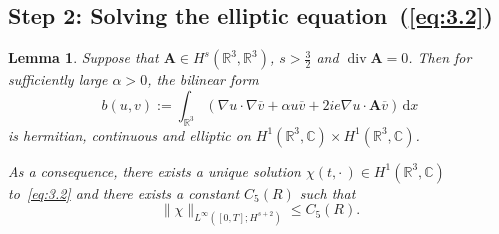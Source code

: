 \documentclass[10pt]{amsart}
\newtheorem{lemm}[theo]{Lemma}\newtheorem{prop}[theo]{Proposition}\newtheorem{coro}[theo]{Corollary}\newtheorem{conj}[theo]{Conjecture}
\theoremstyle{definition}\newtheorem{defi}[theo]{Definition}\newtheorem{rema}[theo]{Remark}\newtheorem{exam}[theo]{Example}\newtheorem{exem}[theo]{Example}\newtheorem{nota}[theo]{Notation}
\newcommand{\BA}{\mathbf{A}}
\newcommand{\R}{\mathbb{R}}
\newcommand{\Com}{\mathbb{C}}
\DeclareMathOperator{\Div}{div}
\newcommand*{\dd}{\mathrm{d}}
\newcommand*{\dx}{\dd x}
\begin{document}
\subsection*{Step 2: Solving the elliptic equation~(\ref{eq:3.2})}

\begin{lemm}\label{elliptic2}
Suppose that $\BA \in H^s(\R^3,\R^3)$, $s > \frac{3}{2}$ and $\Div \BA=0$. Then for sufficiently large $\alpha>0$, the bilinear form
\[
b(u,v) := \int_{\R^3} (\nabla u \cdot \nabla \overline{v}
+\alpha u\overline{v}+ 2ie \nabla u\cdot \BA \overline{v}) \,\dx
\]
is hermitian, continuous and elliptic on $H^1(\R^3,\Com)\times H^1(\R^3,\Com)$.

As a consequence, there exists a unique solution $\chi(t,{\cdot\,}) \in H^1(\R^3,\Com)$ to~\eqref{eq:3.2} and there exists a constant $C_5(R)$ such that
\[
\|\chi \|_{L^\infty([0,T];H^{s+2})}\leq C_5(R).
\]
\end{lemm}
\end{document}
